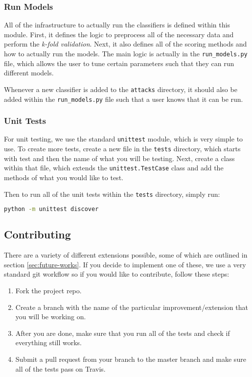 \subsubsection{Run Models}

All of the infrastructure to actually run the classifiers is defined within this module.
First, it defines the logic to preprocess all of the necessary data and perform the \textit{k-fold validation}.
Next, it also defines all of the scoring methods and how to actually run the models.
The main logic is actually in the \texttt{run\_models.py} file, which allows the user to tune certain parameters such that they can run different models.

Whenever a new classifier is added to the \texttt{attacks} directory, it should also be added within the \texttt{run\_models.py} file such that a user knows that it can be run.

\subsubsection{Unit Tests}

For unit testing, we use the standard \texttt{unittest} module, which is very simple to use.
To create more tests, create a new file in the \texttt{tests} directory, which starts with test and then the name of what you will be testing.
Next, create a class within that file, which extends the \texttt{unittest.TestCase} class and add the methods of what you would like to test.

Then to run all of the unit tests within the \texttt{tests} directory, simply run:
\begin{lstlisting}[language=Bash]
python -m unittest discover
\end{lstlisting}

\newpage

\subsection{Contributing}

There are a variety of different extensions possible, some of which are outlined in section \ref{sec:future-works}.
If you decide to implement one of these, we use a very standard git workflow so if you would like to contribute, follow these steps:

\begin{enumerate}
  \item Fork the project repo.
  \item Create a branch with the name of the particular improvement/extension that you will be working on.
  \item After you are done, make sure that you run all of the tests and check if everything still works.
  \item Submit a pull request from your branch to the master branch and make sure all of the tests pass on Travis.
\end{enumerate}

